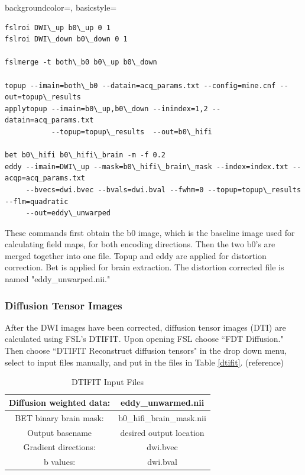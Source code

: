 {
    backgroundcolor=\color{white},
    basicstyle=\scriptsize\color{black}\ttfamily
}

\begin{lstlisting}[style=DOS]
fslroi DWI\_up b0\_up 0 1
fslroi DWI\_down b0\_down 0 1

fslmerge -t both\_b0 b0\_up b0\_down

topup --imain=both\_b0 --datain=acq_params.txt --config=mine.cnf --out=topup\_results
applytopup --imain=b0\_up,b0\_down --inindex=1,2 --datain=acq_params.txt
           --topup=topup\_results  --out=b0\_hifi

bet b0\_hifi b0\_hifi\_brain -m -f 0.2
eddy --imain=DWI\_up --mask=b0\_hifi\_brain\_mask --index=index.txt --acqp=acq_params.txt
     --bvecs=dwi.bvec --bvals=dwi.bval --fwhm=0 --topup=topup\_results --flm=quadratic
     --out=eddy\_unwarped

\end{lstlisting}

These commands first obtain the b0 image, which is the baseline image used for calculating field maps, for both encoding directions. Then the two b0's are merged together into one file. Topup and eddy are applied for distortion correction. Bet is applied for brain extraction. The distortion corrected file is named "eddy\_unwarped.nii."

\subsubsection{Diffusion Tensor Images}

After the DWI images have been corrected, diffusion tensor images (DTI) are calculated using FSL's DTIFIT. Upon opening FSL choose ``FDT Diffusion." Then choose ``DTIFIT Reconstruct diffusion tensors" in the drop down menu, select to input files manually, and put in the files in Table \ref{dtifit}. (reference)

\begin{table}[H]
\centering
\caption{DTIFIT Input Files}
\label{ta:dtifit}
\begin{tabular}{|c|c|}
\hline
Diffusion weighted data: & eddy\_unwarmed.nii        \\ \hline
BET binary brain mask:   & b0\_hifi\_brain\_mask.nii \\ \hline
Output basename          & desired output location   \\ \hline
Gradient directions:     & dwi.bvec                  \\ \hline
b values:                & dwi.bval                  \\ \hline
\end{tabular}
\end{table}

